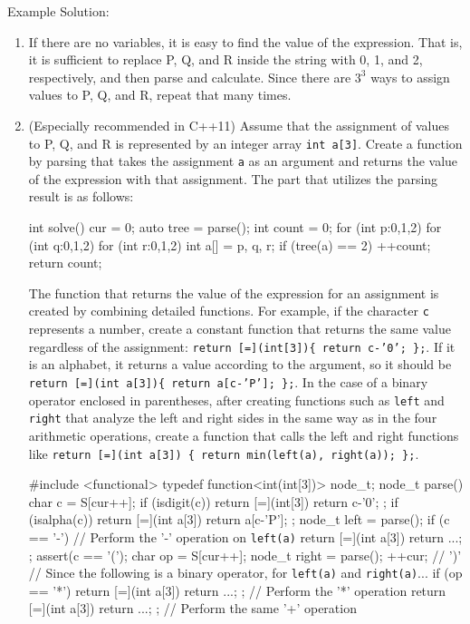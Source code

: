 Example Solution:
\begin{enumerate}
\item If there are no variables, it is easy to find the value of the expression. That is, it is sufficient to replace P, Q, and R inside the string with 0, 1, and 2, respectively, and then parse and calculate. Since there are $3^3$ ways to assign values to P, Q, and R, repeat that many times.
\item (Especially recommended in C++11) Assume that the assignment of values to P, Q, and R is represented by an integer array \texttt{int a[3]}. Create a function by parsing that takes the assignment \texttt{a} as an argument and returns the value of the expression with that assignment. The part that utilizes the parsing result is as follows:
  \begin{c11box}
int solve() {
    cur = 0;
    auto tree = parse();
    int count = 0;
    for (int p:{0,1,2})
	for (int q:{0,1,2})
	    for (int r:{0,1,2}) {
		int a[] = {p, q, r};
		if (tree(a) == 2) ++count;
	    }
    return count;
}    
  \end{c11box}
The function that returns the value of the expression for an assignment is created by combining detailed functions. For example, if the character \texttt{c} represents a number, create a constant function that returns the same value regardless of the assignment: \texttt{return [=](int[3])\{ return c-'0'; \};}. If it is an alphabet, it returns a value according to the argument, so it should be \texttt{return [=](int a[3])\{
  return a[c-'P']; \};}. In the case of a binary operator enclosed in parentheses, after creating functions such as \texttt{left} and \texttt{right} that analyze the left and right sides in the same way as in the four arithmetic operations, create a function that calls the left and right functions like \texttt{return [=](int a[3]) \{ return min(left(a), right(a)); \};}.
\begin{c11box}
#include <functional>
typedef function<int(int[3])> node_t;
node_t parse() {
    char c = S[cur++];
    if (isdigit(c))
	return [=](int[3]){ return c-'0'; };
    if (isalpha(c))
	return [=](int a[3]){ return a[c-'P']; };
    node_t left = parse();
    if (c == '-')  // Perform the '-' operation on \texttt{left(a)}
	return [=](int a[3]) { return ...; };
    assert(c == '(');
    char op = S[cur++];
    node_t right = parse();
    ++cur; // ')'
    // Since the following is a binary operator, for \texttt{left(a)} and \texttt{right(a)}...
    if (op == '*')
	return [=](int a[3]) { return ...; }; // Perform the '*' operation
    return [=](int a[3]) { return ...; }; // Perform the same '+' operation
}  
\end{c11box}
\end{enumerate}

